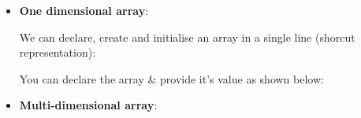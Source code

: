 \setlength{\columnsep}{3pt}
\begin{flushleft}

	\begin{itemize}
		\item \textbf{One dimensional array}:\par

		We can declare, create and initialise an array in a single line (shorcut representation):
		
		
	
		You can declare the array \& provide it's value as shown below:
		\bigskip

		\bigskip
	
		\item \textbf{Multi-dimensional array}:
		

				
		
		
	\end{itemize}
		
	
\end{flushleft}
\newpage


